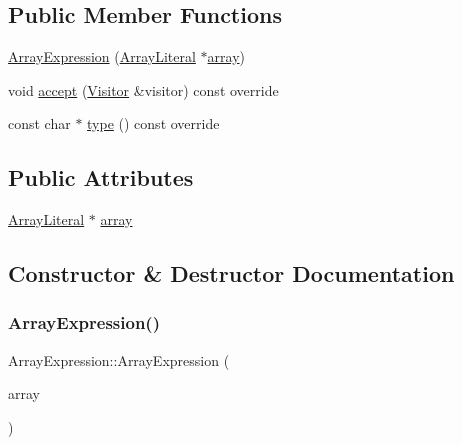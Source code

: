 \subsection*{Public Member Functions}
\begin{DoxyCompactItemize}
\item 
\hyperlink{struct_array_expression_ae28e87942dea36d36f3e17460deebbad}{Array\+Expression} (\hyperlink{struct_array_literal}{Array\+Literal} $\ast$\hyperlink{struct_array_expression_a5eaa8dd89911611323de0d6f8221ac1d}{array})
\item 
void \hyperlink{struct_array_expression_a6f1d854ef3cfe2731aee50a45c774b5d}{accept} (\hyperlink{struct_visitor}{Visitor} \&visitor) const override
\item 
const char $\ast$ \hyperlink{struct_array_expression_ad0e148cb5a9de93a554e756cde23103e}{type} () const override
\end{DoxyCompactItemize}
\subsection*{Public Attributes}
\begin{DoxyCompactItemize}
\item 
\hyperlink{struct_array_literal}{Array\+Literal} $\ast$ \hyperlink{struct_array_expression_a5eaa8dd89911611323de0d6f8221ac1d}{array}
\end{DoxyCompactItemize}


\subsection{Constructor \& Destructor Documentation}
\mbox{\label{struct_array_expression_ae28e87942dea36d36f3e17460deebbad}} 
\subsubsection{\texorpdfstring{Array\+Expression()}{ArrayExpression()}}
{\footnotesize\ttfamily Array\+Expression\+::\+Array\+Expression (\begin{DoxyParamCaption}\item[{\hyperlink{struct_array_literal}{Array\+Literal} $\ast$}]{array }\end{DoxyParamCaption})\hspace{0.3cm}{\ttfamily [inline]}}



